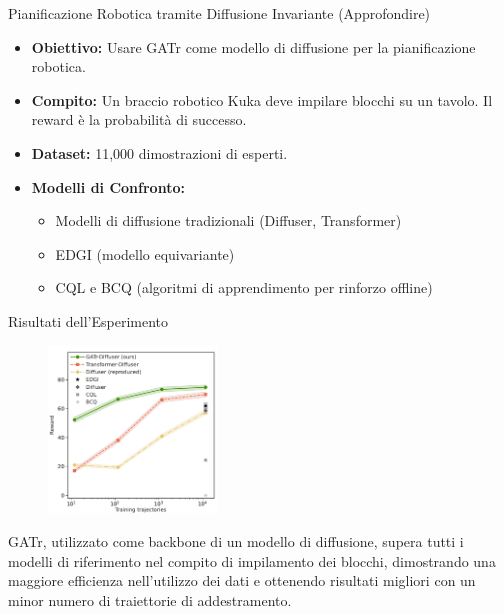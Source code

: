 \begin{frame}{Pianificazione Robotica tramite Diffusione Invariante}
    (Approfondire)\\
    \begin{itemize}
        \item \textbf{Obiettivo:} Usare GATr come modello di diffusione per la 
        pianificazione robotica.
        \item \textbf{Compito:} Un braccio robotico Kuka deve impilare blocchi su un 
        tavolo. Il reward è la probabilità di successo.
        \item \textbf{Dataset:} 11,000 dimostrazioni di esperti.
        \item \textbf{Modelli di Confronto:}
        \begin{itemize}
            \item Modelli di diffusione tradizionali (Diffuser, Transformer)
            \item EDGI (modello equivariante)
            \item CQL e BCQ (algoritmi di apprendimento per rinforzo offline)
        \end{itemize}
    \end{itemize}
    
\end{frame}
    
\begin{frame}{Risultati dell'Esperimento}
    \begin{figure}
        \centering
        \includegraphics[width=0.4\textwidth]{../Images/Kena.png}
    \end{figure}

    GATr, utilizzato come backbone di un modello di diffusione, supera tutti i modelli 
    di riferimento nel compito di impilamento dei blocchi, dimostrando una maggiore 
    efficienza nell'utilizzo dei dati e ottenendo risultati migliori con un minor numero 
    di traiettorie di addestramento.
\end{frame}
    
